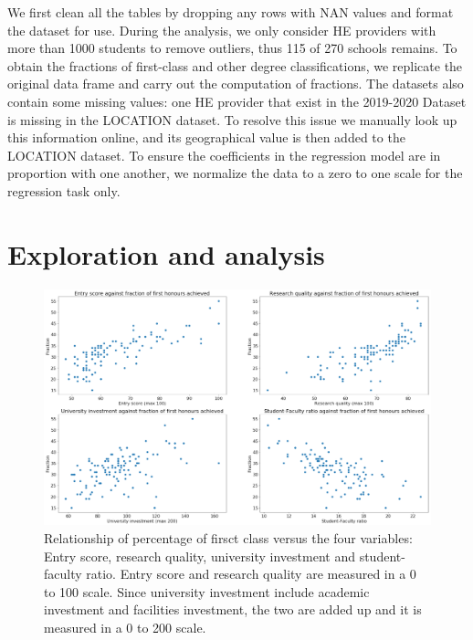 \documentclass[11pt,a4paper]{article}
\begin{document}
We first clean all the tables by dropping any rows with NAN values and format the dataset for use. During the analysis, we only consider HE providers with more than 1000 students to remove outliers, thus 115 of 270 schools remains. To obtain the fractions of first-class and other degree classifications, we replicate the original data frame and carry out the computation of fractions. The datasets also contain some missing values: one HE provider that exist in the 2019-2020 Dataset is missing in the LOCATION dataset. To resolve this issue we manually look up this information online, and its geographical value is then added to the LOCATION dataset. To ensure the coefficients in the regression model are in proportion with one another, we normalize the data to a zero to one scale for the regression task only. 

\section{Exploration and  analysis}

\begin{figure}[t]
    \centering
    \includegraphics[width=15.24cm]{report/Q13FFF.pdf}
    \caption{Relationship of percentage of firsct class versus the four variables: Entry score, research quality, university investment and student-faculty ratio. Entry score and research quality are measured in a 0 to 100 scale. Since university investment include academic investment and facilities investment, the two are added up and it is measured in a 0 to 200 scale. }
    \label{fig:Q13}
\end{figure}
\end{document}
